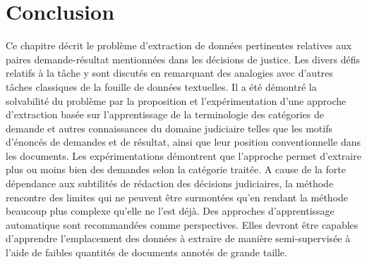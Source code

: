 \section{Conclusion}
\label{sec:quanta:conclusion}
Ce chapitre décrit le problème d'extraction de données pertinentes relatives aux paires demande-résultat mentionnées dans les décisions de justice. Les divers défis relatifs à la tâche  y sont discutés en remarquant des analogies avec d'autres tâches classiques de la fouille de données textuelles. Il a été démontré la solvabilité du problème par la proposition et l'expérimentation d'une approche d'extraction basée sur l'apprentissage de la terminologie des catégories de demande et autres connaissances du domaine judiciaire telles que les motifs d'énoncés de demandes et de résultat, ainsi que leur position conventionnelle dans les documents.  Les expérimentations démontrent que l'approche permet d'extraire plus ou moins bien des demandes selon la catégorie traitée. A cause de la  forte dépendance aux subtilités de rédaction des décisions judiciaires, la méthode rencontre des limites qui ne peuvent être surmontées qu'en rendant la méthode beaucoup plus complexe qu'elle ne l'est déjà. Des approches d'apprentissage automatique sont recommandées comme perspectives. Elles devront être capables d'apprendre l'emplacement des données à extraire de manière semi-supervisée à l'aide de faibles quantités de documents annotés de grande taille.
